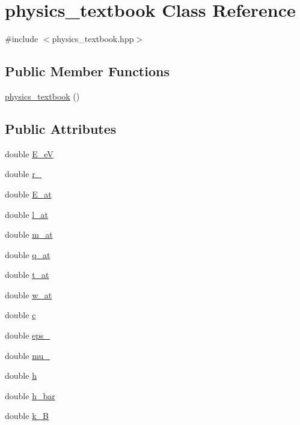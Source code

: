 \hypertarget{classphysics__textbook}{}\section{physics\+\_\+textbook Class Reference}
\label{classphysics__textbook}


{\ttfamily \#include $<$physics\+\_\+textbook.\+hpp$>$}

\subsection*{Public Member Functions}
\begin{DoxyCompactItemize}
\item 
\mbox{\hyperlink{classphysics__textbook_a89b6993c2aecf444cd2fa540c73a110b}{physics\+\_\+textbook}} ()
\end{DoxyCompactItemize}
\subsection*{Public Attributes}
\begin{DoxyCompactItemize}
\item 
double \mbox{\hyperlink{classphysics__textbook_a73e078553f4f440e99aacad83f7df6d6}{E\+\_\+eV}}
\item 
double \mbox{\hyperlink{classphysics__textbook_ac429976f0dc885d846d8b31c24f45bd6}{r\+\_}}
\item 
double \mbox{\hyperlink{classphysics__textbook_aed1451ff3400dce39969e5ac319f033a}{E\+\_\+at}}
\item 
double \mbox{\hyperlink{classphysics__textbook_a4479790cea56c47a7db44d2d331c4cef}{l\+\_\+at}}
\item 
double \mbox{\hyperlink{classphysics__textbook_a6bb18bb140fbce54e2c73a7f2a72509f}{m\+\_\+at}}
\item 
double \mbox{\hyperlink{classphysics__textbook_aba33444d21762e4cbcfec165e6fd3ece}{q\+\_\+at}}
\item 
double \mbox{\hyperlink{classphysics__textbook_acdcf772ff70c544f8394b3a9fc57674c}{t\+\_\+at}}
\item 
double \mbox{\hyperlink{classphysics__textbook_a63250c79f053fa4aa1c8f3505971b4f1}{w\+\_\+at}}
\item 
double \mbox{\hyperlink{classphysics__textbook_a3c6dd19f14166d6c90d6f53aa4e31885}{c}}
\item 
double \mbox{\hyperlink{classphysics__textbook_a8ea9a65f207ec6ad3388e605f385454c}{eps\+\_}}
\item 
double \mbox{\hyperlink{classphysics__textbook_a300762c199172d9f76183b49db5f0f33}{mu\+\_}}
\item 
double \mbox{\hyperlink{classphysics__textbook_a416573e2d9fa6793711a69cdb291d824}{h}}
\item 
double \mbox{\hyperlink{classphysics__textbook_a5ec9850f0fa1b25180d8f6d1ed734848}{h\+\_\+bar}}
\item 
double \mbox{\hyperlink{classphysics__textbook_a666f84f0f7f65910169ed6b82129e5c8}{k\+\_\+B}}
\end{DoxyCompactItemize}


